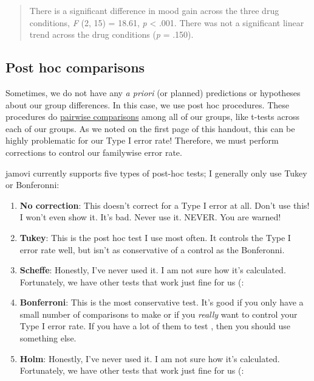 \documentclass[
]{book}
\providecommand{\tightlist}{%
  \setlength{\itemsep}{0pt}\setlength{\parskip}{0pt}}
\begin{document}
\begin{quote}
There is a significant difference in mood gain across the three drug conditions, \emph{F} (2, 15) = 18.61, \emph{p} \textless{} .001. There was not a significant linear trend across the drug conditions (\emph{p} = .150).
\end{quote}

\hypertarget{post-hoc-comparisons}{%
\subsection{Post hoc comparisons}\label{post-hoc-comparisons}}

Sometimes, we do not have any \emph{a priori} (or planned) predictions or hypotheses about our group differences. In this case, we use post hoc procedures. These procedures do \underline{pairwise comparisons} among all of our groups, like t-tests across each of our groups. As we noted on the first page of this handout, this can be highly problematic for our Type I error rate! Therefore, we must perform corrections to control our familywise error rate.

jamovi currently supports five types of post-hoc tests; I generally only use Tukey or Bonferonni:

\begin{enumerate}
\def\labelenumi{\arabic{enumi}.}
\tightlist
\item
  \textbf{No correction}: This doesn't correct for a Type I error at all. Don't use this! I won't even show it. It's bad. Never use it. NEVER. You are warned!
\item
  \textbf{Tukey}: This is the post hoc test I use most often. It controls the Type I error rate well, but isn't as conservative of a control as the Bonferonni.
\item
  \textbf{Scheffe}: Honestly, I've never used it. I am not sure how it's calculated. Fortunately, we have other tests that work just fine for us (:
\item
  \textbf{Bonferroni}: This is the most conservative test. It's good if you only have a small number of comparisons to make or if you \emph{really} want to control your Type I error rate. If you have a lot of them to test , then you should use something else.
\item
  \textbf{Holm}: Honestly, I've never used it. I am not sure how it's calculated. Fortunately, we have other tests that work just fine for us (:
\end{enumerate}
\end{document}
